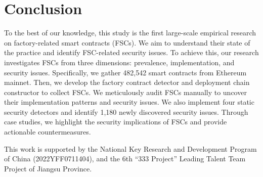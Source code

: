 \documentclass[acmsmall,screen]{acmart}
\begin{document}
	\section{Conclusion}\label{sec:conclusion}
	To the best of our knowledge, this study is the first large-scale empirical research on factory-related smart contracts (FSCs). We aim to understand their state of the practice and identify FSC-related security issues. To achieve this, our research investigates FSCs from three dimensions: prevalence, implementation, and security issues. Specifically, we gather 482,542 smart contracts from Ethereum mainnet. Then, we develop the factory contract detector and deployment chain constructor to collect FSCs. We meticulously audit FSCs manually to uncover their implementation patterns and security issues. We also implement four static security detectors and identify 1,180 newly discovered security issues. Through case studies, we highlight the security implications of FSCs and provide actionable countermeasures.

	\begin{acks}
		This work is supported by the National Key Research and Development Program of China \newline(2022YFF0711404),  and the 6th “333 Project” Leading Talent Team Project of Jiangsu Province.
	\end{acks}




	
	
\end{document}
